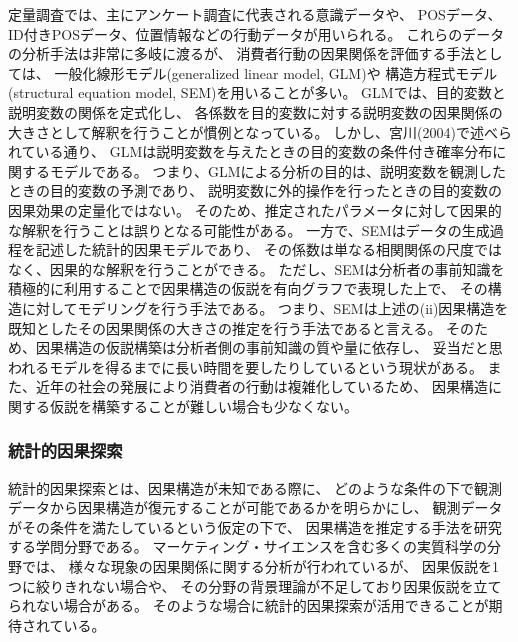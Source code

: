 定量調査では、主にアンケート調査に代表される意識データや、
POSデータ、ID付きPOSデータ、位置情報などの行動データが用いられる。
これらのデータの分析手法は非常に多岐に渡るが、
消費者行動の因果関係を評価する手法としては、
一般化線形モデル(generalized linear model, GLM)や
構造方程式モデル(structural equation model, SEM)を用いることが多い\cite{2015-pb}\cite{2009-qw}。
GLMでは、目的変数と説明変数の関係を定式化し、
各係数を目的変数に対する説明変数の因果関係の大きさとして解釈を行うことが慣例となっている。
しかし、宮川(2004)\cite{2004-qj}で述べられている通り、
GLMは説明変数を与えたときの目的変数の条件付き確率分布に関するモデルである。
つまり、GLMによる分析の目的は、説明変数を観測したときの目的変数の予測であり、
説明変数に外的操作を行ったときの目的変数の因果効果の定量化ではない。
そのため、推定されたパラメータに対して因果的な解釈を行うことは誤りとなる可能性がある。
一方で、SEMはデータの生成過程を記述した統計的因果モデルであり、
その係数は単なる相関関係の尺度ではなく、因果的な解釈を行うことができる\cite{2004-qj}。
ただし、SEMは分析者の事前知識を積極的に利用することで因果構造の仮説を有向グラフで表現した上で、
その構造に対してモデリングを行う手法である。
つまり、SEMは上述の(ii)因果構造を既知としたその因果関係の大きさの推定を行う手法であると言える。
そのため、因果構造の仮説構築は分析者側の事前知識の質や量に依存し、
妥当だと思われるモデルを得るまでに長い時間を要したりしているという現状がある。
また、近年の社会の発展により消費者の行動は複雑化しているため、
因果構造に関する仮説を構築することが難しい場合も少なくない。


\subsubsection{統計的因果探索}

統計的因果探索とは、因果構造が未知である際に、
どのような条件の下で観測データから因果構造が復元することが可能であるかを明らかにし、
観測データがその条件を満たしているという仮定の下で、
因果構造を推定する手法を研究する学問分野である。
マーケティング・サイエンスを含む多くの実質科学の分野では、
様々な現象の因果関係に関する分析が行われているが、
因果仮説を1つに絞りきれない場合や、
その分野の背景理論が不足しており因果仮説を立てられない場合がある。
そのような場合に統計的因果探索が活用できることが期待されている\cite{2017-zx}。

